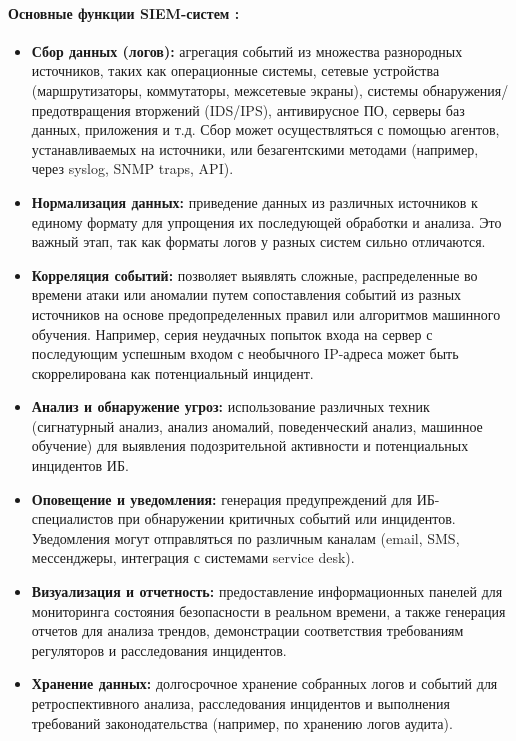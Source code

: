 \paragraph*{Основные функции SIEM-систем \cite{IBMSIEM}:}
\begin{itemize}
    \item \textbf{Сбор данных (логов):} агрегация событий из множества разнородных источников, таких как операционные системы, сетевые устройства (маршрутизаторы, коммутаторы, межсетевые экраны), системы обнаружения/предотвращения вторжений (IDS/IPS), антивирусное ПО, серверы баз данных, приложения и т.д. Сбор может осуществляться с помощью агентов, устанавливаемых на источники, или безагентскими методами (например, через syslog, SNMP traps, API).
    \item \textbf{Нормализация данных:} приведение данных из различных источников к единому формату для упрощения их последующей обработки и анализа. Это важный этап, так как форматы логов у разных систем сильно отличаются.
    \item \textbf{Корреляция событий:} позволяет выявлять сложные, распределенные во времени атаки или аномалии путем сопоставления событий из разных источников на основе предопределенных правил или алгоритмов машинного обучения. Например, серия неудачных попыток входа на сервер с последующим успешным входом с необычного IP-адреса может быть скоррелирована как потенциальный инцидент.
    \item \textbf{Анализ и обнаружение угроз:} использование различных техник (сигнатурный анализ, анализ аномалий, поведенческий анализ, машинное обучение) для выявления подозрительной активности и потенциальных инцидентов ИБ.
    \item \textbf{Оповещение и уведомления:} генерация предупреждений для ИБ-специалистов при обнаружении критичных событий или инцидентов. Уведомления могут отправляться по различным каналам (email, SMS, мессенджеры, интеграция с системами service desk).
    \item \textbf{Визуализация и отчетность:} предоставление информационных панелей	 для мониторинга состояния безопасности в реальном времени, а также генерация отчетов для анализа трендов, демонстрации соответствия требованиям регуляторов и расследования инцидентов.
    \item \textbf{Хранение данных:} долгосрочное хранение собранных логов и событий для ретроспективного анализа, расследования инцидентов и выполнения требований законодательства (например, по хранению логов аудита).
\end{itemize}

